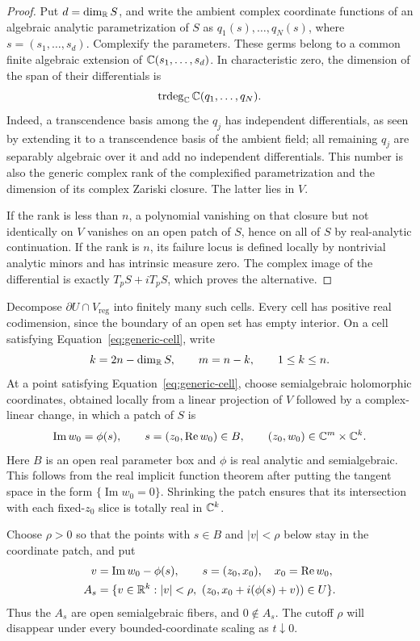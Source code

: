\begin{proof}
Put $d=\dim_{\mathbb R}S$, and write the ambient complex coordinate functions
of an algebraic analytic parametrization of $S$ as
$q_1(s),\ldots,q_N(s)$, where $s=(s_1,\ldots,s_d)$.  Complexify the
parameters.  These germs belong to a common finite algebraic extension
of $\mathbb C(s_1,\ldots,s_d)$.  In characteristic zero, the dimension of the
span of their differentials is
\[
 \operatorname{trdeg}_{\mathbb C}\mathbb C(q_1,\ldots,q_N).
\]
Indeed, a transcendence basis among the $q_j$ has independent
differentials, as seen by extending it to a transcendence basis of the
ambient field; all remaining $q_j$ are separably algebraic over it and
add no independent differentials.  This number is also the generic
complex rank of the complexified parametrization and the dimension of
its complex Zariski closure.  The latter lies in $V$.

If the rank is less than $n$, a polynomial vanishing on that closure
but not identically on $V$ vanishes on an open patch of $S$, hence on
all of $S$ by real-analytic continuation.  If the rank is $n$, its
failure locus is defined locally by nontrivial analytic minors and has
intrinsic measure zero.  The complex image of the differential is
exactly $T_pS+iT_pS$, which proves the alternative.
\end{proof}

Decompose $\partial U\cap V_{\mathrm{reg}}$ into finitely many such
cells.  Every cell has positive real codimension, since the boundary of
an open set has empty interior.  On a cell satisfying
Equation~\eqref{eq:generic-cell}, write
\[
 k=2n-\dim_{\mathbb R}S,\qquad m=n-k,
 \qquad 1\leq k\leq n.
\]
At a point satisfying Equation~\eqref{eq:generic-cell}, choose
semialgebraic holomorphic coordinates, obtained locally from a linear
projection of $V$ followed by a complex-linear change, in which a patch
of $S$ is
\begin{equation}
 \operatorname{Im}w_0=\phi(s),\qquad
 s=(z_0,\operatorname{Re}w_0)\in B,
 \qquad (z_0,w_0)\in\mathbb C^m\times\mathbb C^k.
 \label{eq:boundary-graph}
\end{equation}
Here $B$ is an open real parameter box and $\phi$ is real analytic and
semialgebraic.  This follows from the real implicit function theorem
after putting the tangent space in the form
$\{\operatorname{Im}w_0=0\}$.  Shrinking the patch ensures that its
intersection with each fixed-$z_0$ slice is totally real in $\mathbb C^k$.

Choose $\rho>0$ so that the points with $s\in B$ and
$|v|<\rho$ below stay in the coordinate patch, and put
\begin{equation}
 \begin{split}
 v&=\operatorname{Im}w_0-\phi(s),\qquad
 s=(z_0,x_0),\quad x_0=\operatorname{Re}w_0,\\
 A_s&=\{v\in\mathbb R^k:|v|<\rho,\
       (z_0,x_0+i(\phi(s)+v))\in U\}.
 \end{split}
 \label{eq:offset-fibers}
\end{equation}
Thus the $A_s$ are open semialgebraic fibers, and $0\notin A_s$.
The cutoff $\rho$ will disappear under every bounded-coordinate scaling
as $t\downarrow0$.

